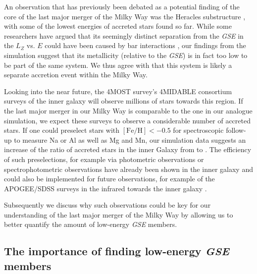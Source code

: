 \documentclass[fleqn,usenatbib]{mnras}
\begin{document}
An observation that has previously been debated as a potential finding of the core of the last major merger of the Milky Way was the Heracles substructure \citep{Horta2021}, with some of the lowest energies of accreted stars found so far. While some researchers have argued that its seemingly distinct separation from the \textit{GSE} in the $L_Z$ vs. $E$ could have been caused by bar interactions \citep{Dillamore2025}, our findings from the simulation suggest that its metallicity (relative to the \textit{GSE}) is in fact too low to be part of the same system. We thus agree with \citet{Horta2021} that this system is likely a separate accretion event within the Milky Way.

Looking into the near future, the 4MOST survey's 4MIDABLE consortium surveys of the inner galaxy \citep{4MOST_HR_DiskBulge, 4MOST_LR_DiskBulge} will observe millions of stars towards this region. If the last major merger in our Milky Way is comparable to the one in our analogue simulation, we expect these surveys to observe a considerable number of accreted stars. If one could preselect stars with $\mathrm{[Fe/H]} < -0.5$ for spectroscopic follow-up to measure Na or Al as well as Mg and Mn, our simulation data suggests an increase of the ratio of accreted stars in the inner Galaxy from  to . The efficiency of such preselections, for example via photometric observations \citep[for example from the Pristine and SkyMapper surveys][]{Starkenburg2017, DaCosta2019} or spectrophotometric observations \citep[for example by combining \textit{Gaia} BP/RP spectrophotometry and narrow-band Pristine photometry][]{Martin2024} have already been shown in the inner galaxy \citep[for example by][with the Pristine Inner Galaxy Survey]{Arentsen2020, Arentsen2020b} and could also be implemented for future observations, for example of the APOGEE/SDSS surveys in the infrared towards the inner galaxy \citep{Santana2021}.

Subsequently we discuss why such observations could be key for our understanding of the last major merger of the Milky Way by allowing us to better quantify the amount of low-energy \textit{GSE} members.

\subsection{The importance of finding low-energy \textit{GSE} members} \label{sec:discussion_strategy_finding_gse_members}
\end{document}
